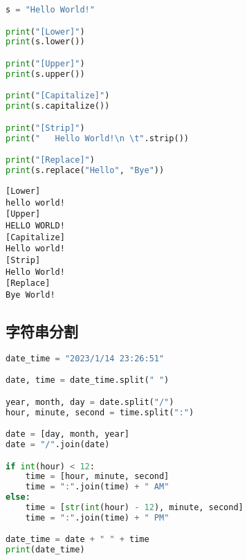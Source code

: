 
\begin{lstlisting}[language=Python]
s = "Hello World!"

print("[Lower]")
print(s.lower())

print("[Upper]")
print(s.upper())

print("[Capitalize]")
print(s.capitalize())

print("[Strip]")
print("   Hello World!\n \t".strip())

print("[Replace]")
print(s.replace("Hello", "Bye"))
\end{lstlisting}

\begin{tcolorbox}
	\begin{verbatim}
[Lower]
hello world!
[Upper]
HELLO WORLD!
[Capitalize]
Hello world!
[Strip]
Hello World!
[Replace]
Bye World!
\end{verbatim}
\end{tcolorbox}

\vspace{0.5cm}

\subsection{字符串分割}

\begin{table}[H]
	\centering
\end{table}


\begin{lstlisting}[language=Python]
date_time = "2023/1/14 23:26:51"

date, time = date_time.split(" ")

year, month, day = date.split("/")
hour, minute, second = time.split(":")

date = [day, month, year]
date = "/".join(date)

if int(hour) < 12:
	time = [hour, minute, second]
	time = ":".join(time) + " AM"
else:
	time = [str(int(hour) - 12), minute, second]
	time = ":".join(time) + " PM"

date_time = date + " " + time
print(date_time)
\end{lstlisting}

